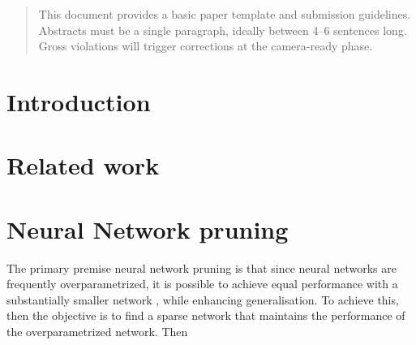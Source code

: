 \documentclass[nohyperref]{article}
\theoremstyle{plain}
\theoremstyle{definition}
\theoremstyle{remark}
\begin{document}
\printAffiliationsAndNotice{\icmlEqualContribution} %

\begin{abstract}
This document provides a basic paper template and submission guidelines.
Abstracts must be a single paragraph, ideally between 4--6 sentences long.
Gross violations will trigger corrections at the camera-ready phase.
\end{abstract}

\section{Introduction}


\section{Related work}


    

\section{Neural Network pruning}



The primary premise neural network pruning is that since neural networks are frequently overparametrized, it is possible to achieve equal performance with a substantially smaller network \cite{reedPruningAlgorithmsaSurvey1993}, while enhancing generalisation.
To achieve this, then the objective is to find a sparse network that maintains the performance of the overparametrized network. Then
\end{document}
